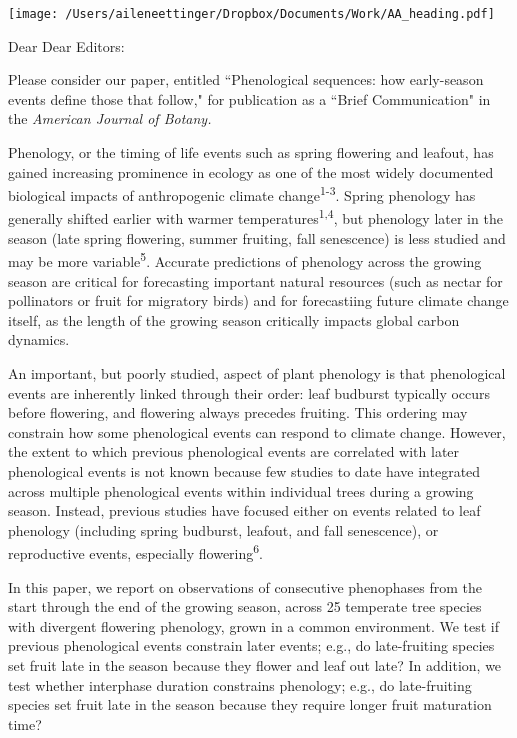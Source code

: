 \documentclass[10.95pt,a4paper]{letter}
\date{March 21, 2018}
\begin{document}
%

\begin{letter}{}
\texttt{[image: /Users/aileneettinger/Dropbox/Documents/Work/AA\_heading.pdf]}

\opening{Dear Dear Editors:}
Please consider our paper, entitled ``Phenological sequences: how early-season events define those that follow," for publication as a ``Brief Communication" in the \emph{American Journal of Botany.}

Phenology, or the timing of life events such as spring flowering and leafout, has gained increasing prominence in ecology as one of the most widely documented biological impacts of anthropogenic climate change\textsuperscript{1-3}. Spring phenology has generally shifted earlier with warmer temperatures\textsuperscript{1,4}, but phenology later in the season (late spring flowering, summer fruiting, fall senescence) is less studied and may be more variable\textsuperscript{5}. Accurate predictions of phenology across the growing season are critical for forecasting important natural resources (such as nectar for pollinators or fruit for migratory birds) and for forecastiing future climate change itself, as the length of the growing season critically impacts global carbon dynamics. 

An important, but poorly studied, aspect of plant phenology is that phenological events are inherently linked through their order: leaf budburst typically occurs before flowering, and flowering always precedes fruiting. This ordering may constrain how some phenological events can respond to climate change. However, the extent to which previous phenological events are correlated with later phenological events is not known because few studies to date have integrated across multiple phenological events within individual trees during a growing season. Instead, previous studies have focused either on events related to leaf phenology (including spring budburst, leafout, and fall senescence), or reproductive events, especially flowering\textsuperscript{6}. 


In this paper, we report on observations of consecutive phenophases from the start through the end of the growing season, across 25 temperate tree species with divergent flowering phenology, grown in a common environment. We test if previous phenological events constrain later events; e.g., do late-fruiting species set fruit late in the season because they flower and leaf out late? In addition, we test whether interphase duration constrains phenology; e.g., do late-fruiting species set fruit late in the season because they require longer fruit maturation time? 


\end{letter}
\end{document}
